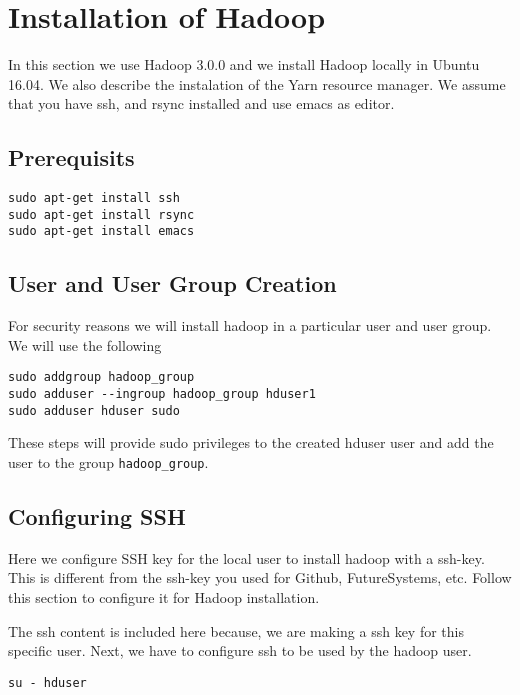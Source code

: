 \section{Installation of Hadoop}\label{s:hadoop-local-installation}

In this section we use Hadoop 3.0.0 and we install Hadoop locally in
Ubuntu 16.04. We also describe the instalation of the Yarn
resource manager. We assume that you have ssh, and rsync installed and
use emacs as editor. 

\subsection{Prerequisits}

\begin{lstlisting}
sudo apt-get install ssh
sudo apt-get install rsync
sudo apt-get install emacs
\end{lstlisting}

\subsection{User and User Group Creation}

For security reasons we will install hadoop in a particular user and
user group. We will use the following

\begin{lstlisting}
sudo addgroup hadoop_group
sudo adduser --ingroup hadoop_group hduser1
sudo adduser hduser sudo
\end{lstlisting}

These steps will provide sudo privileges to the created hduser
user and add the user to the group \verb|hadoop_group|.

\subsection{Configuring SSH}

\begin{NOTE}
  Here we configure SSH key for the local user to install hadoop with a ssh-key.
  This is different from the ssh-key you used for Github, FutureSystems, etc.
  Follow this section to configure it for Hadoop installation. 
\end{NOTE}

The ssh content is included here because, we are making a
ssh key for this specific user. 
Next, we have to configure ssh to be used by the hadoop user.

\begin{lstlisting}
su - hduser
\end{lstlisting}

